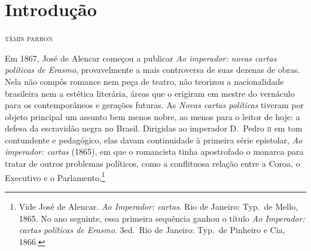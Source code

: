 \chapter*{Introdução}

\begin{flushright}
\textsc{tâmis parron}
\end{flushright}

\noindent{}Em 1867, José de Alencar começou a publicar \textit{Ao imperador: novas
cartas políticas de Erasmo}, provavelmente a mais controversa de suas
dezenas de obras. Nela não compôs romance nem peça de teatro, não
teorizou a nacionalidade brasileira nem a estética literária, áreas que
o erigiram em mestre do vernáculo para os contemporâneos e gerações
futuras. As \textit{Novas cartas políticas} tiveram por objeto
principal um assunto bem menos nobre, ao menos para o leitor de hoje: a
defesa da escravidão negra no Brasil. Dirigidas ao imperador D.~Pedro
\textsc{ii} em tom contundente e pedagógico, elas davam continuidade à primeira
série epistolar, \textit{Ao imperador: cartas} (1865), em que o
romancista tinha apostrofado o monarca para tratar de outros problemas
políticos, como a conflituosa relação entre a Coroa, o Executivo e o
Parlamento.\footnote{ Vide José de Alencar. \textit{Ao Imperador:
cartas}. Rio de Janeiro: Typ.~de Mello, 1865. No ano seguinte, essa
primeira sequência ganhou o título \textit{Ao Imperador: cartas
políticas de Erasmo}. 3\ai ed.~Rio de Janeiro: Typ.~de Pinheiro e Cia, 1866.} 

